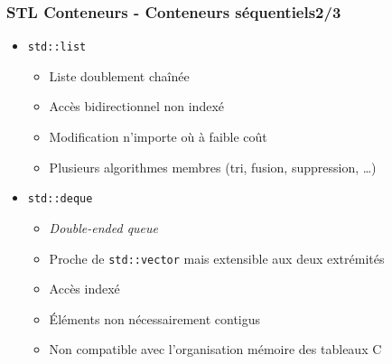 \documentclass[C++.tex]{subfiles}
\begin{document}
\begin{frame}
	\frametitle{STL Conteneurs - Conteneurs séquentiels\titlehfill{}2/3}
	\begin{itemize}
		\item \lstinline|std::list|
		\begin{itemize}
			\item Liste doublement chaînée
			\item Accès bidirectionnel non indexé
			\item Modification n'importe où à faible coût
			\item Plusieurs algorithmes membres (tri, fusion, suppression, \ldots)

		\end{itemize}

		\item \lstinline|std::deque|
		\begin{itemize}
			\item \textit{Double-ended queue}
			\item Proche de \lstinline|std::vector| mais extensible aux deux extrémités
			\item Accès indexé
			\item Éléments non nécessairement contigus
			\item Non compatible avec l'organisation mémoire des tableaux C
		\end{itemize}
	\end{itemize}
\end{frame}
\end{document}
